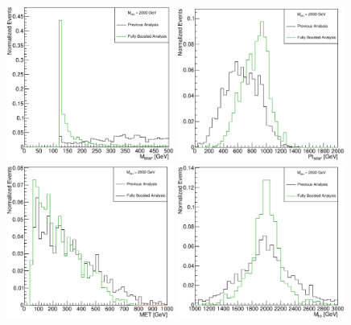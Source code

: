 \begin{figure}[h!]
\begin{center}
\includegraphics[width=0.49\textwidth]{figures/WHad_plots_john_withcuts/electron/hww_m_Xhh2000}
\includegraphics[width=0.49\textwidth]{figures/WHad_plots_john_withcuts/electron/hww_pt_Xhh2000}\\
\includegraphics[width=0.49\textwidth]{figures/WHad_plots_john_withcuts/electron/wlep_met_Xhh2000}
\includegraphics[width=0.49\textwidth]{figures/WHad_plots_john_withcuts/electron/hh_m_Xhh2000}

\end{center}
\end{figure}
